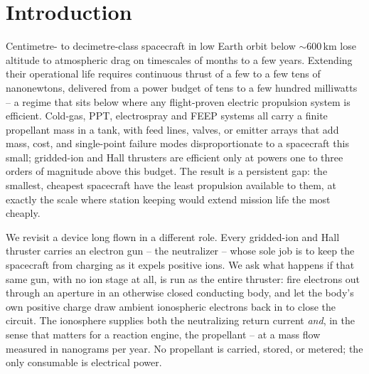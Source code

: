 \documentclass[11pt]{article}
\begin{document}
\section{Introduction}
\label{sec:intro}

Centimetre- to decimetre-class spacecraft in low Earth orbit below
$\sim$600\,km lose altitude to atmospheric drag on timescales of months to a
few years. Extending their operational life requires continuous thrust of a
few to a few tens of nanonewtons, delivered from a power budget of tens to a
few hundred milliwatts -- a regime that sits below where any flight-proven
electric propulsion system is efficient. Cold-gas, PPT, electrospray and FEEP
systems all carry a finite propellant mass in a tank, with feed lines,
valves, or emitter arrays that add mass, cost, and single-point failure modes
disproportionate to a spacecraft this small; gridded-ion and Hall thrusters
are efficient only at powers one to three orders of magnitude above this
budget. The result is a persistent gap: the smallest, cheapest spacecraft
have the least propulsion available to them, at exactly the scale where
station keeping would extend mission life the most cheaply.

We revisit a device long flown in a different role. Every gridded-ion and
Hall thruster carries an electron gun -- the neutralizer -- whose sole job is
to keep the spacecraft from charging as it expels positive ions. We ask what
happens if that same gun, with no ion stage at all, is run as the entire
thruster: fire electrons out through an aperture in an otherwise closed
conducting body, and let the body's own positive charge draw ambient
ionospheric electrons back in to close the circuit. The ionosphere supplies
both the neutralizing return current \emph{and}, in the sense that matters
for a reaction engine, the propellant -- at a mass flow measured in
nanograms per year. No propellant is carried, stored, or metered; the only
consumable is electrical power.
\end{document}
